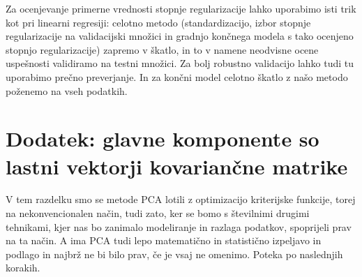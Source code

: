 Za ocenjevanje primerne vrednosti stopnje regularizacije lahko uporabimo isti trik kot pri linearni regresiji: celotno metodo (standardizacijo, izbor stopnje regularizacije na validacijski množici in gradnjo končnega modela s tako ocenjeno stopnjo regularizacije) zapremo v škatlo, in to v namene neodvisne ocene uspešnosti validiramo na testni množici. Za bolj robustno validacijo lahko tudi tu uporabimo prečno preverjanje. In za končni model celotno škatlo z našo metodo poženemo na vseh podatkih.

\section{Dodatek: glavne komponente so lastni vektorji kovariančne matrike}

V tem razdelku smo se metode PCA lotili z optimizacijo kriterijske funkcije, torej na nekonvencionalen način, tudi zato, ker se bomo s številnimi drugimi tehnikami, kjer nas bo zanimalo modeliranje in razlaga podatkov, spoprijeli prav na ta način. A ima PCA tudi lepo matematično in statistično izpeljavo in podlago in najbrž ne bi bilo prav, če je vsaj ne omenimo. Poteka po naslednjih korakih.

